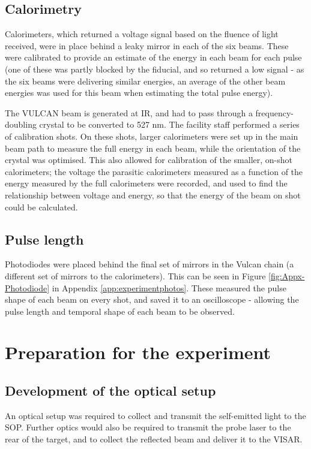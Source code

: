 \subsection{Calorimetry}
Calorimeters, which returned a voltage signal based on the fluence of light received, were in place behind a leaky mirror in each of the six beams. These were calibrated to provide an estimate of the energy in each beam for each pulse (one of these was partly blocked by the fiducial, and so returned a low signal - as the six beams were delivering similar energies, an average of the other beam energies was used for this beam when estimating the total pulse energy).

The VULCAN beam is generated at IR, and had to pass through a frequency-doubling crystal to be converted to 527 \unit{\nano\meter}. The facility staff performed a series of calibration shots. On these shots, larger calorimeters were set up in the main beam path to measure the full energy in each beam, while the orientation of the crystal was optimised. This also allowed for calibration of the smaller, on-shot calorimeters; the voltage the parasitic calorimeters measured as a function of the energy measured by the full calorimeters were recorded, and used to find the relationship between voltage and energy, so that the energy of the beam on shot could be calculated.

\subsection{Pulse length}
Photodiodes were placed behind the final set of mirrors in the Vulcan chain (a different set of mirrors to the calorimeters). This can be seen in Figure \ref{fig:Appx-Photodiode} in Appendix \ref{app:experimentphotos}. These measured the pulse shape of each beam on every shot, and saved it to an oscilloscope - allowing the pulse length and temporal shape of each beam to be observed.

\section{Preparation for the experiment}

\subsection{Development of the optical setup}

An optical setup was required to collect and transmit the self-emitted light to the SOP. Further optics would also be required to transmit the probe laser to the rear of the target, and to collect the reflected beam and deliver it to the VISAR. 

